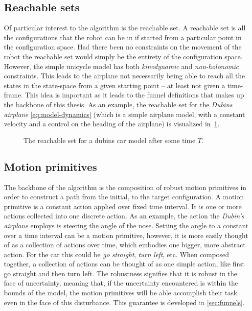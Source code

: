 \subsection{Reachable sets}
\label{subsec:reachable-set}

Of particular interest to the \rrtfunnel{} algorithm is the reachable set. A
reachable set is all the configurations that the robot can be in if started from
a particular point in the configuration space. Had there been no constraints on
the movement of the robot the reachable set would simply be the entirety of the
configuration space. However, the simple unicycle model has both
\textit{kinodynamic} and \textit{non-holonomic} constraints. This leads to the
airplane not necessarily being able to reach all the states in the state-space
from a given starting point -- at least not given a time-frame. This idea is
important as it leads to the funnel definitions that makes up the backbone of
this thesis. As an example, the reachable set for the \textit{Dubins airplane}
\eqref{eq:model-dynamics} (which is a simple airplane model, with a constant
velocity and a control on the heading of the airplane) is visualized
in~\cref{fig:reachable-set-dubin}.

\begin{figure}
  \centering 
  \caption{The reachable set for a dubins car model after some time \(T\).}
  \label{fig:reachable-set-dubin}
\end{figure}

\subsection{Motion primitives}

The backbone of the \rrtfunnel{} algorithm is the composition of robust motion
primitives in order to construct a path from the initial, to the target
configuration. A motion primitive is a constant action applied over fixed time
interval. It is one or more actions collected into one discrete action. As an
example, the action the \textit{Dubin's airplane} employs is steering the angle
of the nose. Setting the angle to a constant over a time interval can be a
motion primitive, however, it is more easily thought of as a collection of
actions over time, which embodies one bigger, more abstract action. For the car
this could be \textit{go straight}, \textit{turn left}, etc. When composed
together, a collection of actions can be thought of as one simple action, like
first go straight and then turn left. The robustness signifies that it is robust
in the face of uncertainty, meaning that, if the uncertainty encountered is
within the bounds of the model, the motion primitives will be able accomplish
their task even in the face of this disturbance. This guarantee is developed in
\cref{sec:funnels}.

